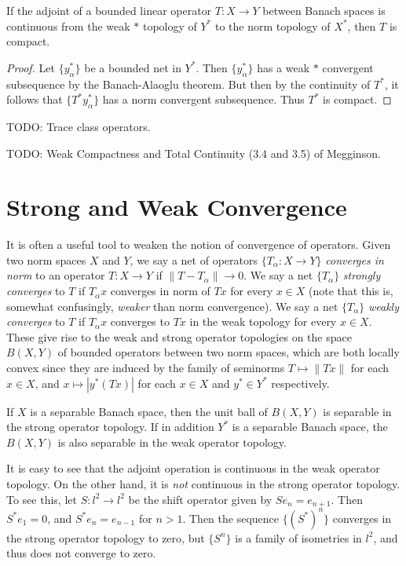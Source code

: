 \begin{theorem}
    If the adjoint of a bounded linear operator $T: X \to Y$ between Banach spaces is continuous from the weak $*$ topology of $Y^*$ to the norm topology of $X^*$, then $T$ is compact.
\end{theorem}
\begin{proof}
    Let $\{ y_\alpha^* \}$ be a bounded net in $Y^*$. Then $\{ y_\alpha^* \}$ has a weak $*$ convergent subsequence by the Banach-Alaoglu theorem. But then by the continuity of $T^*$, it follows that $\{ T^* y_\alpha^* \}$ has a norm convergent subsequence. Thus $T^*$ is compact.
\end{proof}

TODO: Trace class operators.

TODO: Weak Compactness and Total Continuity (3.4 and 3.5) of Megginson.








\section{Strong and Weak Convergence}

It is often a useful tool to weaken the notion of convergence of operators. Given two norm spaces $X$ and $Y$, we say a net of operators $\{ T_\alpha : X \to Y \}$ \emph{converges in norm} to an operator $T: X \to Y$ if $\| T - T_\alpha \| \to 0$. We say a net $\{ T_\alpha \}$ \emph{strongly converges} to $T$ if $T_\alpha x$ converges in norm of $Tx$ for every $x \in X$ (note that this is, somewhat confusingly, \emph{weaker} than norm convergence). We say a net $\{ T_\alpha \}$ \emph{weakly converges} to $T$ if $T_\alpha x$ converges to $Tx$ in the weak topology for every $x \in X$. These give rise to the weak and strong operator topologies on the space $B(X,Y)$ of bounded operators between two norm spaces, which are both locally convex since they are induced by the family of seminorms $T \mapsto \| Tx \|$ for each $x \in X$, and $x \mapsto |y^*(Tx)|$ for each $x \in X$ and $y^* \in Y^*$ respectively.

If $X$ is a separable Banach space, then the unit ball of $B(X,Y)$ is separable in the strong operator topology. If in addition $Y^*$ is a separable Banach space, the $B(X,Y)$ is also separable in the weak operator topology.

It is easy to see that the adjoint operation is continuous in the weak operator topology. On the other hand, it is \emph{not} continuous in the strong operator topology. To see this, let $S: l^2 \to l^2$ be the shift operator given by $Se_n = e_{n+1}$. Then $S^*e_1 = 0$, and $S^*e_n = e_{n-1}$ for $n > 1$. Then the sequence $\{ (S^*)^n \}$ converges in the strong operator topology to zero, but $\{ S^n \}$ is a family of isometries in $l^2$, and thus does not converge to zero.

